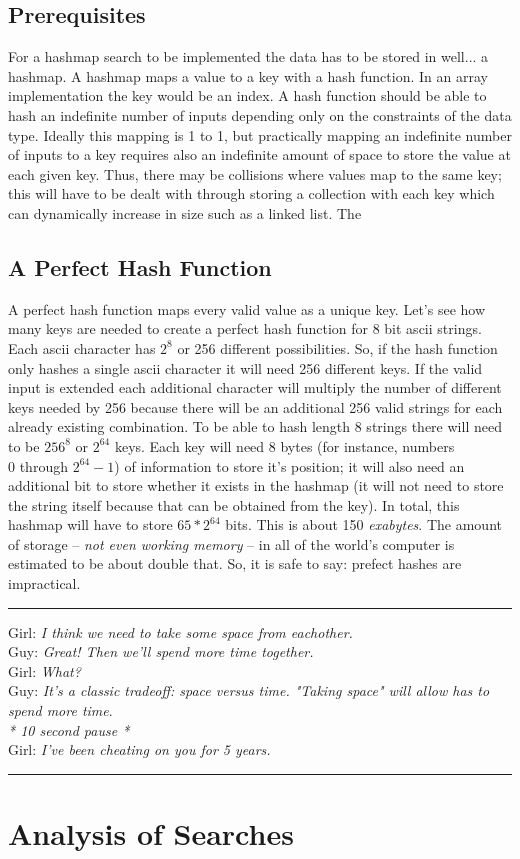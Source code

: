 \documentclass[letterpaper, 10pt]{article}
\begin{document}
\subsection{Prerequisites}
For a hashmap search to be implemented the data has to be stored in well... a hashmap. A hashmap maps
a value to a key with a hash function. In an array implementation the key would be an index. A hash function
should be able to hash an indefinite number of inputs depending only on the constraints of the data type. 
Ideally this mapping is 1 to 1, but practically mapping an indefinite number of inputs to a key requires
also an indefinite amount of space to store the value at each given key. Thus, there may be collisions
where values map to the same key; this will have to be dealt with through storing a collection with each key
which can dynamically increase in size such as a linked list. The 

\subsection{A Perfect Hash Function}
A perfect hash function maps every valid value as a unique key. Let's see how many keys
are needed to create a perfect hash function for 8 bit ascii strings. Each ascii character
has $2^8$ or 256 different possibilities. So, if the hash function only hashes
a single ascii character it will need 256 different keys. If the valid input is extended each
additional character will multiply the number of different keys needed by 256 because there will be an
additional 256 valid strings for each already existing combination. To be able to hash length 8
strings there will need to be $256^8$ or $2^{64}$ keys. Each key will need 8 bytes
(for instance, numbers\\ 0 through $2^{64}-1$) of information 
to store it's position; it will also need an additional bit to store whether it exists in
the hashmap (it will not need to store the string itself because that can be obtained from the key).
In total, this hashmap will have to store $65 * 2^{64}$ bits. This is about 150 \textit{exabytes}. The amount
of storage -- \textit{not even working memory} -- in all of the world's computer is estimated to be about double that. So, it is safe to say:
prefect hashes are impractical.

    

\vspace{.25cm}
\hrule
\vspace{.25cm}
\noindent
Girl: \textit{I think we need to take some space from eachother.}\\
Guy: \textit{Great! Then we'll spend more time together.}\\
Girl: \textit{What?}\\
Guy: \textit{It's a classic tradeoff: space versus time. "Taking space" will allow has to spend more time}.\\
\textit{* 10 second pause *}\\
Girl: \textit{I've been cheating on you for 5 years.}\\

\hrule
\vspace{1cm}
\section{Analysis of Searches}
\end{document}
